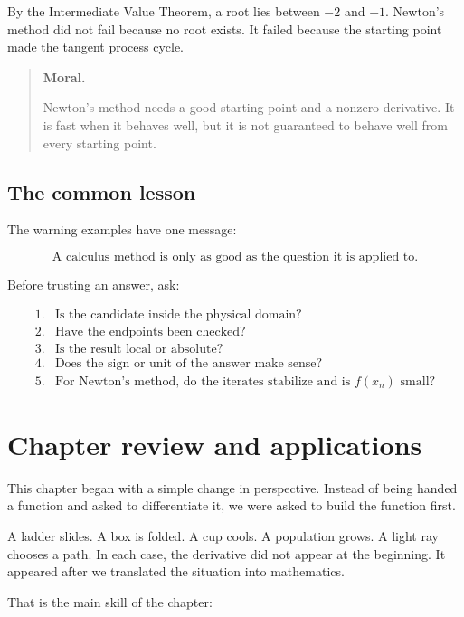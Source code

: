By the Intermediate Value Theorem, a root lies between \(-2\) and \(-1\).  Newton's
method did not fail because no root exists.  It failed because the starting point made
the tangent process cycle.

\begin{quote}
\textbf{Moral.}

Newton's method needs a good starting point and a nonzero derivative.  It is fast when
it behaves well, but it is not guaranteed to behave well from every starting point.
\end{quote}

\subsection{The common lesson}
\label{subsec:common-lesson-warning-examples}

The warning examples have one message:

\[
\boxed{
\text{A calculus method is only as good as the question it is applied to.}
}
\]

Before trusting an answer, ask:

\[
\begin{array}{ll}
\text{1.} & \text{Is the candidate inside the physical domain?}\\
\text{2.} & \text{Have the endpoints been checked?}\\
\text{3.} & \text{Is the result local or absolute?}\\
\text{4.} & \text{Does the sign or unit of the answer make sense?}\\
\text{5.} & \text{For Newton's method, do the iterates stabilize and is \(f(x_n)\) small?}
\end{array}
\]

\section{Chapter review and applications}
\label{sec:chapter7-review-applications}

This chapter began with a simple change in perspective.  Instead of being handed a
function and asked to differentiate it, we were asked to build the function first.

A ladder slides.  A box is folded.  A cup cools.  A population grows.  A light ray
chooses a path.  In each case, the derivative did not appear at the beginning.  It
appeared after we translated the situation into mathematics.

That is the main skill of the chapter:

